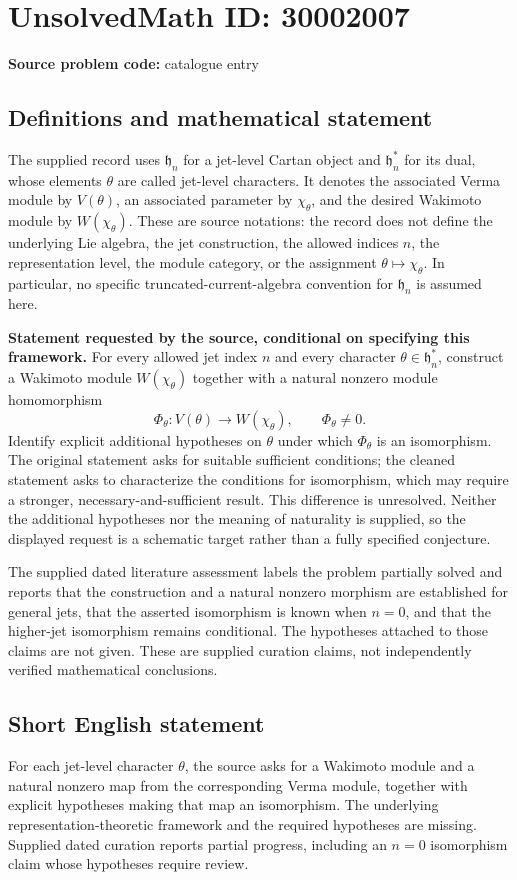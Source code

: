 \documentclass[11pt]{article}
\begin{document}
\section*{UnsolvedMath ID: 30002007}
\textbf{Source problem code:} catalogue entry
\subsection{Definitions and mathematical statement}
The supplied record uses \(\mathfrak h_n\) for a jet-level Cartan object and \(\mathfrak h_n^*\) for its dual, whose elements \(\theta\) are called jet-level characters. It denotes the associated Verma module by \(V(\theta)\), an associated parameter by \(\chi_\theta\), and the desired Wakimoto module by \(W(\chi_\theta)\). These are source notations: the record does not define the underlying Lie algebra, the jet construction, the allowed indices \(n\), the representation level, the module category, or the assignment \(\theta\mapsto\chi_\theta\). In particular, no specific truncated-current-algebra convention for \(\mathfrak h_n\) is assumed here.

\textbf{Statement requested by the source, conditional on specifying this framework.} For every allowed jet index \(n\) and every character \(\theta\in\mathfrak h_n^*\), construct a Wakimoto module \(W(\chi_\theta)\) together with a natural nonzero module homomorphism
\[
\Phi_\theta:V(\theta)\longrightarrow W(\chi_\theta),
\qquad \Phi_\theta\ne 0.
\]
Identify explicit additional hypotheses on \(\theta\) under which \(\Phi_\theta\) is an isomorphism. The original statement asks for suitable sufficient conditions; the cleaned statement asks to characterize the conditions for isomorphism, which may require a stronger, necessary-and-sufficient result. This difference is unresolved. Neither the additional hypotheses nor the meaning of naturality is supplied, so the displayed request is a schematic target rather than a fully specified conjecture.

The supplied dated literature assessment labels the problem partially solved and reports that the construction and a natural nonzero morphism are established for general jets, that the asserted isomorphism is known when \(n=0\), and that the higher-jet isomorphism remains conditional. The hypotheses attached to those claims are not given. These are supplied curation claims, not independently verified mathematical conclusions.
\subsection{Short English statement}
For each jet-level character \(\theta\), the source asks for a Wakimoto module and a natural nonzero map from the corresponding Verma module, together with explicit hypotheses making that map an isomorphism. The underlying representation-theoretic framework and the required hypotheses are missing. Supplied dated curation reports partial progress, including an \(n=0\) isomorphism claim whose hypotheses require review.
\end{document}
